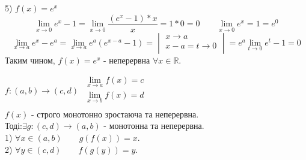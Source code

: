 \documentclass[14pt,a4paper]{scrartcl}
\theoremstyle{definition}
\theoremstyle{remark}
\theoremstyle{definition}
\theoremstyle{definition}
\begin{document}
 5) $f(x) = e^x $
 $$ \lim\limits_{x\to0}{e^x - 1} =  \lim\limits_{x\to0}{\frac{(e^x - 1)*x}{x} } = 1*0 =0 \qquad
 \lim\limits_{x\to 0}{e^x} = 1 = e^0 $$
 $$ \lim\limits_{x\to a}{e^x - e^a} =  \lim\limits_{x\to a}{e^a(e^{x-a} -1)}= \begin{vmatrix}
   x \to a\\
   x-a = t\to 0\\
 \end{vmatrix}   = e^a\lim\limits_{t\to 0}{e^t -1} =0$$
Таким чином, $f(x) = e^x$ - неперервна $\forall x \in \mathbb{R}$.\\
\begin{boxteo}
$f: (a,b) \rightarrow (c,d)$ \qquad $\begin{gathered}
   \lim\limits_{x\to a}{f(x)} = c\\
    \lim\limits_{x\to b}{f(x)} = d\\
\end{gathered}$\\
$f(x)$ - строго монотонно зростаюча та неперервна.\\
Тоді:\quad $\exists g: (c,d) \rightarrow (a,b)$ - монотонна та неперервна.\\
1) $\forall x \in (a,b) \qquad g(f(x)) = x$.\\
2) $\forall y \in (c,d) \qquad f(g(y)) = y$.
\end{boxteo}
\end{document}

